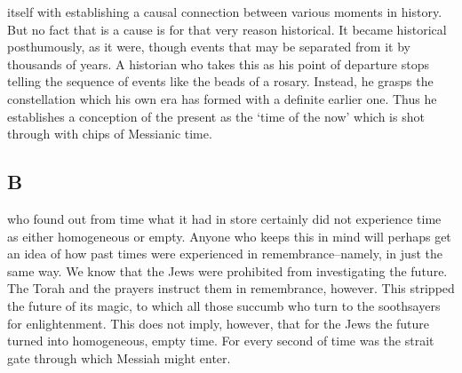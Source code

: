 \documentclass[12pt]{tufte-handout}
\begin{document}
 itself with establishing a causal connection between various moments in history. But no fact that is a cause is for that very reason historical. It became historical posthumously, as it were, though events that may be separated from it by thousands of years. A historian who takes this as his point of departure stops telling the sequence of events like the beads of a rosary. Instead, he grasps the constellation which his own era has formed with a definite earlier one. Thus he establishes a conception of the present as the `time of the now' which is shot through with chips of Messianic time.	 
 	 	 
\subsection{B}	 
 	 	 
 who found out from time what it had in store certainly did not experience time as either homogeneous or empty. Anyone who keeps this in mind will perhaps get an idea of how past times were experienced in remembrance--namely, in just the same way. We know that the Jews were prohibited from investigating the future. The Torah and the prayers instruct them in remembrance, however. This stripped the future of its magic, to which all those succumb who turn to the soothsayers for enlightenment. This does not imply, however, that for the Jews the future turned into homogeneous, empty time. For every second of time was the strait gate through which Messiah might enter.	 

\nocite{*}
{\footnotesize


}
\end{document}
